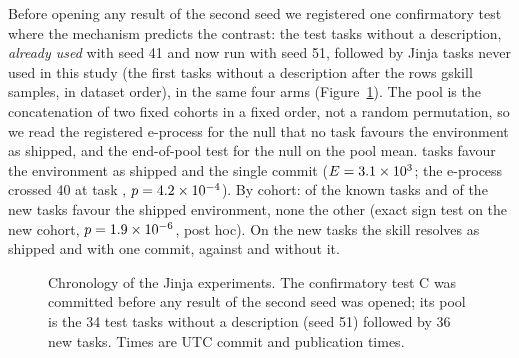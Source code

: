 \documentclass[sigconf,review,anonymous]{acmart}
\begin{document}
Before opening any result of the second seed we registered one confirmatory test where the
mechanism predicts the contrast: the \ncfOld{} test tasks without a description, \emph{already used}
with seed 41 and now run with seed 51, followed by \ncfNew{} Jinja tasks never used in this study
(the first \ncfNew{} tasks without a description after the rows gskill samples, in dataset order),
in the same four arms (Figure~\ref{fig:timeline}). The pool is the concatenation of two fixed
cohorts in a fixed order, not a random permutation, so we read the registered e-process for the
null that no task favours the environment as shipped, and the end-of-pool test for the null on the
pool mean. \ncfFor{} tasks favour the environment as shipped and \ncfAgainst{} the single commit
($E=3.1\times10^{3}$; the e-process crossed 40 at task \ncfCross{}, $p=4.2\times10^{-4}$). By cohort: \ncfOldFor{} of
the \ncfOld{} known tasks and \ncfNewFor{} of the \ncfNew{} new tasks favour the shipped environment,
none the other (exact sign test on the new cohort, $p=1.9\times10^{-6}$, post hoc). On the new tasks the
skill resolves \ncfShipSkill{} as shipped and \ncfLFSkill{} with one commit, against \ncfShipNone{}
and \ncfLFNone{} without it.

\begin{figure}[t]\centering
{}
\caption{Chronology of the Jinja experiments. The confirmatory test C was committed before any
result of the second seed was opened; its pool is the 34 test tasks without a description (seed 51)
followed by 36 new tasks. Times are UTC commit and publication times.}
\label{fig:timeline}
\end{figure}
\end{document}
